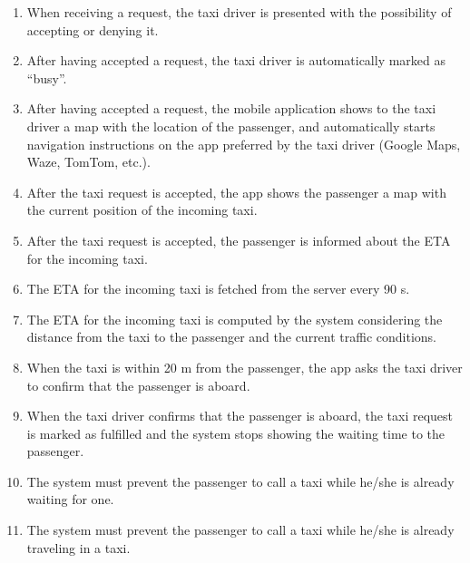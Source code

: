\begin{enumerate}
	\item When receiving a request, the taxi driver is presented with the possibility of accepting or denying it.
	\item After having accepted a request, the taxi driver is automatically marked as ``busy''.
	\item After having accepted a request, the mobile application shows to the taxi driver a map with the location of the passenger, and automatically starts navigation instructions on the app preferred by the taxi driver (Google Maps, Waze, TomTom, etc.).
	\item After the taxi request is accepted, the app shows the passenger a map with the current position of the incoming taxi.
	\item After the taxi request is accepted, the passenger is informed about the ETA for the incoming taxi.
	\item The ETA for the incoming taxi is fetched from the server every 90 s.
	\item The ETA for the incoming taxi is computed by the system considering the distance from the taxi to the passenger and the current traffic conditions.
	\item When the taxi is within 20 m from the passenger, the app asks the taxi driver to confirm that the passenger is aboard.
	\item When the taxi driver confirms that the passenger is aboard, the taxi request is marked as fulfilled and the system stops showing the waiting time to the passenger.
	\item The system must prevent the passenger to call a taxi while he/she is already waiting for one.
	\item The system must prevent the passenger to call a taxi while he/she is already traveling in a taxi.
\end{enumerate}
